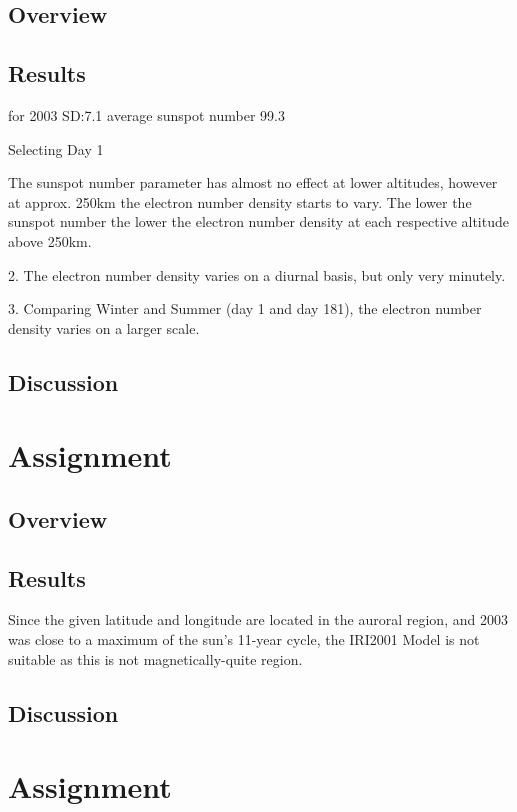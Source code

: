 \subsection{Overview}
\subsection{Results}
for 2003
SD:7.1
average sunspot number 99.3

Selecting Day 1


The sunspot number parameter has almost no effect at lower altitudes, however at approx. 250km the electron number density starts to vary. The lower the sunspot number the lower the electron number density at each respective altitude above 250km.

2. The electron number density varies on a diurnal basis, but only very minutely. 

3. Comparing Winter and Summer (day 1 and day 181), the electron number density varies on a larger scale.
\subsection{Discussion}



\section{Assignment}
\subsection{Overview}
\subsection{Results}
Since the given latitude and longitude are located in the auroral region, and 2003 was close to a maximum of the sun's 11-year cycle, the IRI2001 Model is not suitable as this is not magnetically-quite region.
\subsection{Discussion}



\section{Assignment}
